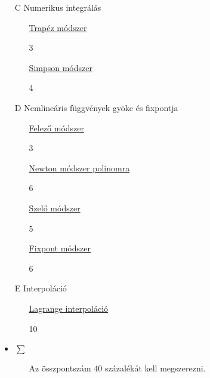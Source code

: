 \documentclass[]{article}
\newcounter{Pontok}
\newcommand{\hreFF}[2]{
\href{#1}{\color{blue}#2}
}
\begin{document}
\begin{itemize}
   \item[C] Numerikus integrálás
      \begin{itemize}
         \item[] \hreFF{Trapez/desc/desc.pdf}{Trapéz módszer } \dotfill
         \addtocounter{Pontok}{3}3
         \item[] \hreFF{Simpson/desc/desc.pdf}{Simpson módszer} \dotfill
         \addtocounter{Pontok}{4}4
      \end{itemize}

   \item[D] Nemlineáris függvények gyöke és fixpontja
      \begin{itemize}
         \item[] \hreFF{Felezo/desc/desc.pdf}{Felező módszer} \dotfill
         \addtocounter{Pontok}{3}3
         \item[] \hreFF{NewtonPoly/desc/desc.pdf}{Newton módszer polinomra} \dotfill
         \addtocounter{Pontok}{6}6
         \item[] \hreFF{Szelo/desc/desc.pdf}{Szelő módszer} \dotfill
         \addtocounter{Pontok}{5}5
         \item[] \hreFF{FixPont/desc/desc.pdf}{Fixpont módszer} \dotfill
         \addtocounter{Pontok}{6}6
      \end{itemize}



   \item[E] Interpoláció
    \begin{itemize}
         \item[] \hreFF{Lagrange/desc/desc.pdf}{Lagrange interpoláció}\dotfill
         \addtocounter{Pontok}{10}10
    \end{itemize}


   \item $\sum$\dotfill {\bf \thePontok}
      \begin{itemize}
         \item[] Az összpontszám $40$ százalékát kell megszerezni.
      \end{itemize}


\end{itemize}

\end{document}
